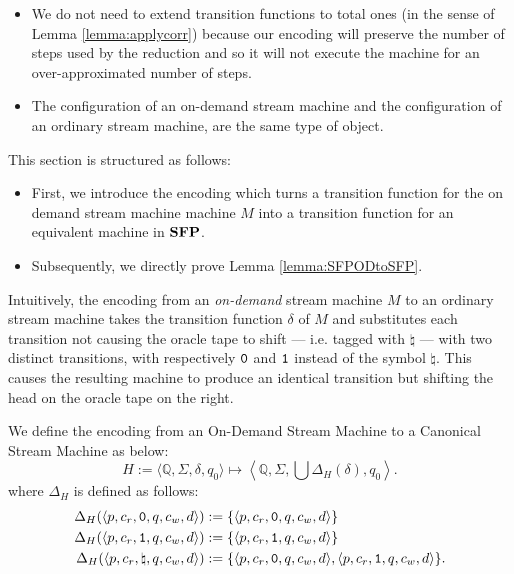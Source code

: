 \begin{itemize}
  \item We do not need to extend transition functions to total ones
  (in the sense of Lemma \ref{lemma:applycorr}) because
  our encoding will preserve the number of steps used by the reduction and so it
  will not execute the machine for an over-approximated number of steps.
  \item The configuration of an on-demand stream machine and the configuration of an
  ordinary stream machine, are the same type of object.
\end{itemize}
\noindent
This section is structured as follows:
\begin{itemize}
  \item First, we introduce the encoding which turns a transition function for the on demand stream machine
  machine $M$ into a transition function for an equivalent machine in $\mathbf{SFP}$.
  \item Subsequently, we directly prove Lemma \ref{lemma:SFPODtoSFP}.
\end{itemize}

Intuitively, the encoding from an \emph{on-demand} stream machine $M$
to an ordinary stream
machine takes the transition function $\delta$ of $M$ and substitutes
each transition not causing the oracle tape to shift --- i.e. tagged with $\natural$ ---
with two distinct
transitions, with respectively $\mathtt{0}$ and $\mathtt{1}$ instead of the symbol $\natural$.
This causes the resulting machine to produce an identical transition
but shifting the head on the oracle tape on the right.

\begin{defn}
  \label{def:SFPODtoSFPmap}
  We define the encoding from an On-Demand Stream Machine to a Canonical Stream Machine
  as below:
  $$
    H := \langle \mathbb Q, \Sigma, \delta, q_0\rangle \mapsto \left\langle \mathbb Q, \Sigma, \bigcup\Delta_H(\delta), q_0\right\rangle.
  $$
  where $\Delta_H$ is defined as follows:
  \begin{align*}
    \Delta_H(\langle p, c_r, \mathtt{0}, q, c_w, d\rangle) &:= \{\langle p, c_r, \mathtt{0}, q, c_w, d\rangle\}\\
    \Delta_H(\langle p, c_r, \mathtt{1}, q, c_w, d\rangle) &:= \{\langle p, c_r, \mathtt{1}, q, c_w, d\rangle\}\\
    \Delta_H(\langle p, c_r, \natural, q, c_w, d\rangle) &:= \{\langle p, c_r, \mathtt{0}, q, c_w, d\rangle, \langle p, c_r, \mathtt{1}, q, c_w, d\rangle\}.\\
  \end{align*}
\end{defn}

